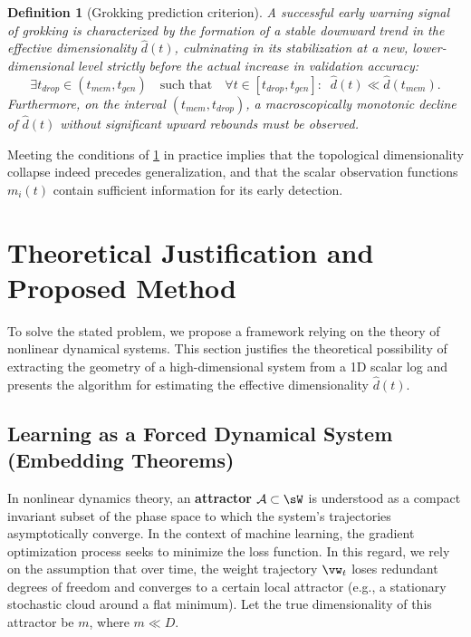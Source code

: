 \documentclass{article}
\newtheorem{definition}{Definition}
\begin{document}
\begin{definition}[Grokking prediction criterion]\label{def:criterion}
A successful early warning signal of grokking is characterized by the formation of a stable downward trend in the effective dimensionality $\hat{d}(t)$, culminating in its stabilization at a new, lower-dimensional level strictly before the actual increase in validation accuracy:
\begin{equation}
    \exists t_{drop} \in (t_{mem}, t_{gen}) \quad \text{such that} \quad \forall t \in [t_{drop}, t_{gen}]: \; \; \hat{d}(t) \ll \hat{d}(t_{mem}).
\end{equation}
Furthermore, on the interval $(t_{mem}, t_{drop})$, a macroscopically monotonic decline of $\hat{d}(t)$ without significant upward rebounds must be observed.
\end{definition}

Meeting the conditions of \cref{def:criterion} in practice implies that the topological dimensionality collapse indeed precedes generalization, and that the scalar observation functions $m_i(t)$ contain sufficient information for its early detection.









\section{Theoretical Justification and Proposed Method}\label{sec:method}

To solve the stated problem, we propose a framework relying on the theory of nonlinear dynamical systems. This section justifies the theoretical possibility of extracting the geometry of a high-dimensional system from a 1D scalar log and presents the algorithm for estimating the effective dimensionality $\hat{d}(t)$.

\subsection{Learning as a Forced Dynamical System (Embedding Theorems)}

In nonlinear dynamics theory, an \textbf{attractor} $\mathcal{A} \subset \sW$ is understood as a compact invariant subset of the phase space to which the system's trajectories asymptotically converge. In the context of machine learning, the gradient optimization process seeks to minimize the loss function. In this regard, we rely on the assumption that over time, the weight trajectory $\vw_t$ loses redundant degrees of freedom and converges to a certain local attractor (e.g., a stationary stochastic cloud around a flat minimum). Let the true dimensionality of this attractor be $m$, where $m \ll D$.
\end{document}
